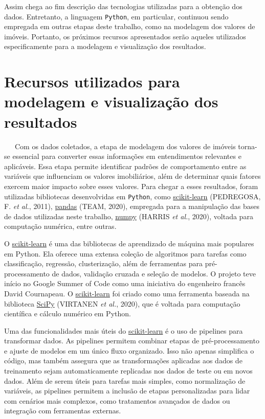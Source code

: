 \documentclass[
  12pt,
  a4paper,
]{scrreprt}
\begin{document}
Assim chega ao fim descrição das tecnologias utilizadas para a obtenção
dos dados. Entretanto, a linguagem \texttt{Python}, em particular,
continuou sendo empregada em outras etapas deste trabalho, como na
modelagem dos valores de imóveis. Portanto, os próximos recursos
apresentados serão aqueles utilizados especificamente para a modelagem e
visualização dos resultados.

\section{Recursos utilizados para modelagem e visualização dos
resultados}\label{recursos-utilizados-para-modelagem-e-visualizauxe7uxe3o-dos-resultados}

~~~Com os dados coletados, a etapa de modelagem dos valores de imóveis
torna-se essencial para converter essas informações em entendimentos
relevantes e aplicáveis. Essa etapa permite identificar padrões de
comportamento entre as variáveis que influenciam os valores
imobiliários, além de determinar quais fatores exercem maior impacto
sobre esses valores. Para chegar a esses resultados, foram utilizadas
bibliotecas desenvolvidas em \texttt{Python}, como
\href{https://scikit-learn.org/stable/}{scikit-learn} (PEDREGOSA, F.
\emph{et al.}, 2011), \href{https://pandas.pydata.org/}{pandas} (TEAM,
2020), empregada para a manipulação das bases de dados utilizadas neste
trabalho, \href{https://numpy.org/}{numpy} (HARRIS \emph{et al.}, 2020),
voltada para computação numérica, entre outras.

\vspace{12pt}

O \href{https://scikit-learn.org/stable/}{scikit-learn} é uma das
bibliotecas de aprendizado de máquina mais populares em Python. Ela
oferece uma extensa coleção de algoritmos para tarefas como
classificação, regressão, clusterização, além de ferramentas para
pré-processamento de dados, validação cruzada e seleção de modelos. O
projeto teve início no Google Summer of Code como uma iniciativa do
engenheiro francês David Cournapeau. O
\href{https://scikit-learn.org/stable/}{scikit-learn} foi criado como
uma ferramenta baseada na biblioteca \href{https://scipy.org/}{SciPy}
(VIRTANEN \emph{et al.}, 2020), que é voltada para computação científica
e cálculo numérico em Python.

\vspace{12pt}

Uma das funcionalidades mais úteis do
\href{https://scikit-learn.org/stable/}{scikit-learn} é o uso de
pipelines para transformar dados. As pipelines permitem combinar etapas
de pré-processamento e ajuste de modelos em um único fluxo organizado.
Isso não apenas simplifica o código, mas também assegura que as
transformações aplicadas aos dados de treinamento sejam automaticamente
replicadas nos dados de teste ou em novos dados. Além de serem úteis
para tarefas mais simples, como normalização de variáveis, as pipelines
permitem a inclusão de etapas personalizadas para lidar com cenários
mais complexos, como tratamentos avançados de dados ou integração com
ferramentas externas.
\end{document}
